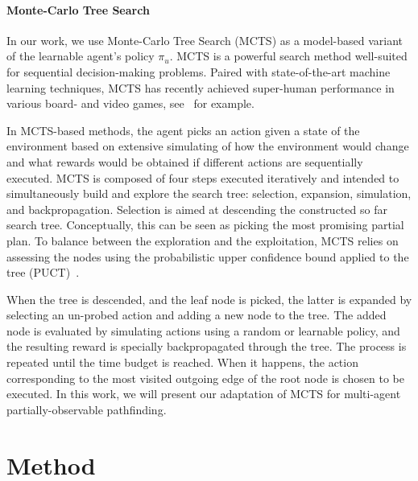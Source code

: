 \documentclass[letterpaper]{article} %
\begin{document}
\paragraph{Monte-Carlo Tree Search} In our work, we use Monte-Carlo Tree Search (MCTS) as a model-based variant of the learnable agent's policy $\pi_u$. MCTS is a powerful  search method well-suited for sequential decision-making problems. Paired with state-of-the-art machine learning techniques, MCTS has recently achieved super-human performance in various board- and video games, see~\cite{silver2017mastering,ye2021mastering} for example.

In MCTS-based methods, the agent picks an action given a state of the environment based on extensive simulating of how the environment would change and what rewards would be obtained if different actions are sequentially executed. MCTS is composed of four steps executed iteratively and intended to simultaneously build and explore the search tree: selection, expansion, simulation, and backpropagation. Selection is aimed at descending the constructed so far search tree. Conceptually, this can be seen as picking the most promising partial plan. To balance between the exploration and the exploitation, MCTS relies on assessing the nodes using the probabilistic upper confidence bound applied to the tree (PUCT)~\cite{rosin_multi-armed_2011}.



When the tree is descended, and the leaf node is picked, the latter is expanded by selecting an un-probed action and adding a new node to the tree. The added node is evaluated by simulating actions using a random or learnable policy, and the resulting reward is specially backpropagated through the tree. The process is repeated until the time budget is reached. When it happens, the action corresponding to the most visited outgoing edge of the root node is chosen to be executed. In this work, we will present our adaptation of MCTS for multi-agent partially-observable pathfinding.


\section{Method}
\end{document}
